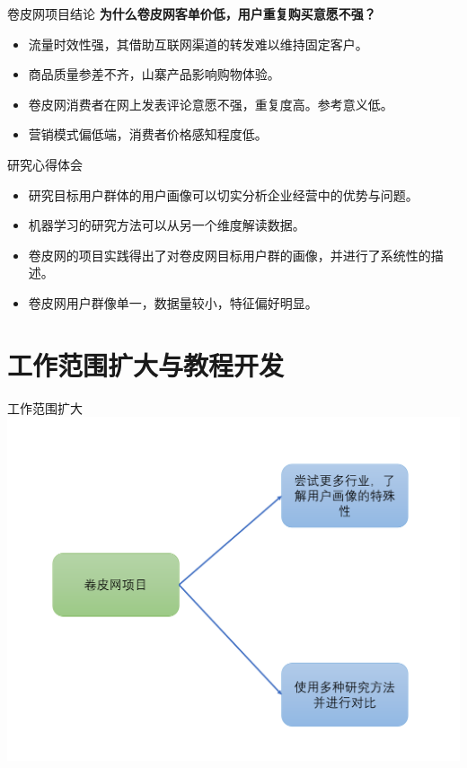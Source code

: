 \documentclass[10pt,aspectratio=32,handout]{beamer}
\begin{document}
\begin{frame}{卷皮网项目结论}
\textbf{为什么卷皮网客单价低，用户重复购买意愿不强？}\newline
  \begin{itemize}
    \item 流量时效性强，其借助互联网渠道的转发难以维持固定客户。\newline
    \item 商品质量参差不齐，山寨产品影响购物体验。\newline
    \item 卷皮网消费者在网上发表评论意愿不强，重复度高。参考意义低。\newline
    \item 营销模式偏低端，消费者价格感知程度低。
  \end{itemize}


\end{frame}

\begin{frame}{研究心得体会}
  \begin{itemize}
    \item 研究目标用户群体的用户画像可以切实分析企业经营中的优势与问题。\newline
    \item 机器学习的研究方法可以从另一个维度解读数据。\newline
    \item 卷皮网的项目实践得出了对卷皮网目标用户群的画像，并进行了系统性的描述。\newline
    \item 卷皮网用户群像单一，数据量较小，特征偏好明显。\newline
  \end{itemize}
\end{frame}

\section{工作范围扩大与教程开发}

\begin{frame}{工作范围扩大}
\includegraphics[height=0.7\paperheight]{amplify}
\end{frame}
\end{document}
